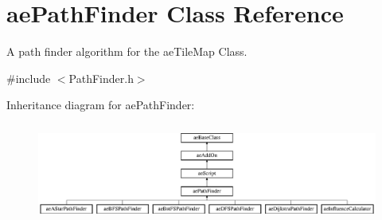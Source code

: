 \hypertarget{classae_path_finder}{}\section{ae\+Path\+Finder Class Reference}
\label{classae_path_finder}


A path finder algorithm for the ae\+Tile\+Map Class.  




{\ttfamily \#include $<$Path\+Finder.\+h$>$}

Inheritance diagram for ae\+Path\+Finder\+:\begin{figure}[H]
\begin{center}
\leavevmode
\includegraphics[height=3.240741cm]{classae_path_finder}
\end{center}
\end{figure}
